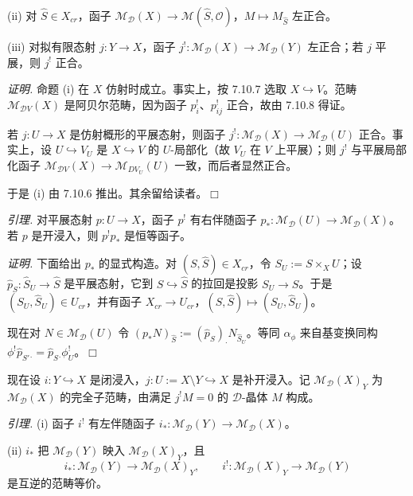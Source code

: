 (ii) 对 $\hat S\in X_{cr}$，函子 $\mathcal{M}_{\mathcal{D}}(X)\to\mathcal{M}(\hat S,\mathcal{O})$，$M\mapsto M_{\hat S}$ 左正合。

(iii) 对拟有限态射 $j:Y\to X$，函子 $j^{!}:\mathcal{M}_{\mathcal{D}}(X)\to\mathcal{M}_{\mathcal{D}}(Y)$ 左正合；若 $j$ 平展，则 $j^{!}$ 正合。

\emph{证明.} 命题 (i) 在 $X$ 仿射时成立。事实上，按 7.10.7 选取 $X\hookrightarrow V$。范畴 $\mathcal{M}_{\mathcal{D}V}(X)$ 是阿贝尔范畴，因为函子 $p^{!}_{i}$、$p^{!}_{ij}$ 正合，故由 7.10.8 得证。


若 $j:U\to X$ 是仿射概形的平展态射，则函子 $j^{!}:\mathcal{M}_{\mathcal{D}}(X)\to\mathcal{M}_{\mathcal{D}}(U)$ 正合。事实上，设 $U\hookrightarrow V_{U}$ 是 $X\hookrightarrow V$ 的 $U$-局部化（故 $V_{U}$ 在 $V$ 上平展）；则 $j^{!}$ 与平展局部化函子 $\mathcal{M}_{\mathcal{D}V}(X)\to\mathcal{M}_{DV_{U}}(U)$ 一致，而后者显然正合。

于是 (i) 由 7.10.6 推出。其余留给读者。\hfill$\Box$

 \emph{引理.} 对平展态射 $p:U\to X$，函子 $p^{!}$ 有右伴随函子 $p_{*}:\mathcal{M}_{\mathcal{D}}(U)\to\mathcal{M}_{\mathcal{D}}(X)$。若 $p$ 是开浸入，则 $p^{!}p_{*}$ 是恒等函子。

\emph{证明.} 下面给出 $p_{*}$ 的显式构造。对 $(S,\hat S)\in X_{cr}$，令 $S_{U}:=S\times_{X}U$；设 $\hat p_{S}:\hat S_{U}\to\hat S$ 是平展态射，它到 $S\hookrightarrow\hat S$ 的拉回是投影 $S_{U}\to S$。于是 $(S_{U},\hat S_{U})\in U_{cr}$，并有函子 $X_{cr}\to U_{cr}$，$(S,\hat S)\mapsto(S_{U},\hat S_{U})$。

现在对 $N\in\mathcal{M}_{\mathcal{D}}(U)$ 令 $(p_{*}N)_{\hat S}:=(\hat p_{S})_{\cdot}N_{\hat S_{U}}$。等同 $\alpha_{\phi}$ 来自基变换同构 $\phi^{!}\hat p_{S'}{}_{\cdot}=\hat p_{S}{}_{\cdot}\phi^{!}_{U}$。\hfill$\Box$

现在设 $i:Y\hookrightarrow X$ 是闭浸入，$j:U:=X\setminus Y\hookrightarrow X$ 是补开浸入。记 $\mathcal{M}_{\mathcal{D}}(X)_{Y}$ 为 $\mathcal{M}_{\mathcal{D}}(X)$ 的完全子范畴，由满足 $j^{!}M=0$ 的 $\mathcal{D}$-晶体 $M$ 构成。

 \emph{引理.} (i) 函子 $i^{!}$ 有左伴随函子 $i_{*}:\mathcal{M}_{\mathcal{D}}(Y)\to\mathcal{M}_{\mathcal{D}}(X)$。

(ii) $i_{*}$ 把 $\mathcal{M}_{\mathcal{D}}(Y)$ 映入 $\mathcal{M}_{\mathcal{D}}(X)_{Y}$，且
\[
i_{*}:\mathcal{M}_{\mathcal{D}}(Y)\to\mathcal{M}_{\mathcal{D}}(X)_{Y},\qquad i^{!}:\mathcal{M}_{\mathcal{D}}(X)_{Y}\to\mathcal{M}_{\mathcal{D}}(Y)
\]
是互逆的范畴等价。

